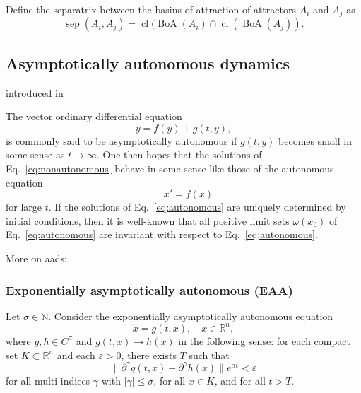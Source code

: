 \documentclass{article}
\newcommand{\sep}{\operatorname{sep}}
\newcommand{\cl}{\operatorname{cl}}
\newcommand{\boa}{\operatorname{BoA}}
\newcounter{ct}
\begin{document}
\begin{definition}[Separatrix]\label{def:separatrix}
Define the separatrix between the basins of attraction of attractors $A_i$ and $A_j$ as 
\begin{equation}
\sep(A_i,A_j) = \cl(\boa(A_i)\cap \cl(\boa(A_j)).
\end{equation}
\end{definition}











\subsection{Asymptotically autonomous dynamics}\label{sec:asyauto}
introduced in  \citep{markus1956asyauto}

The vector ordinary differential equation  
\begin{equation}\label{eq:nonautonomous}
 \dot y = f(y) + g(t, y),
\end{equation}
is commonly said to be asymptotically autonomous if \( g(t, y) \) becomes small in some sense as \( t \to \infty \). One then hopes that the solutions of Eq.~\ref{eq:nonautonomous} behave in some sense like those of the autonomous equation  
\begin{equation}\label{eq:autonomous}
\quad x' = f(x)
\end{equation}
for large \( t \). If the solutions of Eq.~\ref{eq:autonomous} are uniquely determined by initial conditions,   then it is well-known \cite{} that all positive limit sets \( \omega(x_0) \) of Eq.~\ref{eq:autonomous} are invariant with respect to Eq.~\ref{eq:autonomous}.

More on aads:  \citep{wieczorek2021compactification}

\subsubsection{Exponentially asymptotically autonomous (EAA)}
\begin{definition}\label{def:eaa}
Let \(\sigma \in \mathbb{N}\). Consider the exponentially asymptotically autonomous equation  
\[
\dot{x} = g(t,x), \quad x \in \mathbb{R}^n,
\]
where \( g, h \in C^\sigma \) and \( g(t,x) \to h(x) \) in the following sense: for each compact set \( K \subset \mathbb{R}^n \) and each \( \varepsilon > 0 \), there exists \( T \) such that  
\[
\|\partial^\gamma g(t,x) - \partial^\gamma h(x)\| e^{\alpha t} < \varepsilon
\]
for all multi-indices \( \gamma \) with \( |\gamma| \leq \sigma \), for all \( x \in K \), and for all \( t > T \).
\end{definition}
\end{document}
